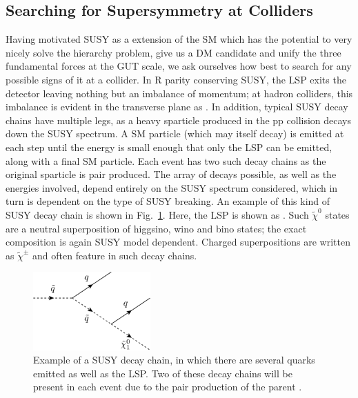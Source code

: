 \subsection{Searching for Supersymmetry at Colliders}

Having motivated \ac{SUSY} as a extension of the \ac{SM} which has the potential to very nicely solve the hierarchy problem, give us a \ac{DM} candidate and unify the three fundamental forces at the \ac{GUT} scale, we ask ourselves how best to search for any possible signs of it at a collider.
In R parity conserving \ac{SUSY}, the \ac{LSP} exits the detector leaving nothing but an imbalance of momentum; at hadron colliders, this imbalance is evident in the transverse plane as \MET.
In addition, typical \ac{SUSY} decay chains have multiple legs, as a heavy sparticle produced in the pp collision decays down the \ac{SUSY} spectrum. 
A \ac{SM} particle (which may itself decay) is emitted at each step until the energy is small enough that only the \ac{LSP} can be emitted, along with a final \ac{SM} particle.
Each event has two such decay chains as the original sparticle is pair produced. 
The array of decays possible, as well as the energies involved, depend entirely on the \ac{SUSY} spectrum considered, which in turn is dependent on the type of \ac{SUSY} breaking.
An example of this kind of \ac{SUSY} decay chain is shown in Fig.~\ref{fig:SUSYdecaychain}. 
Here, the LSP is shown as \chiOneZero. 
Such $\tilde{\chi}^{0}$ states are a neutral superposition of higgsino, wino and bino states; the exact composition is again \ac{SUSY} model dependent.
Charged superpositions are written as $\tilde{\chi}^{\pm}$ and often feature in such decay chains.

\begin{figure}[htbp]
  \begin{center}
  \includegraphics[width=0.4\textwidth]{Figures/theory/susyDecayChain.pdf}
  \caption{Example of a \ac{SUSY} decay chain, in which there are several quarks emitted as well as the \ac{LSP}. Two of these decay chains will be present in each event due to the pair production of the parent \squark.}
   \label{fig:SUSYdecaychain}
   \end{center}
\end{figure}


